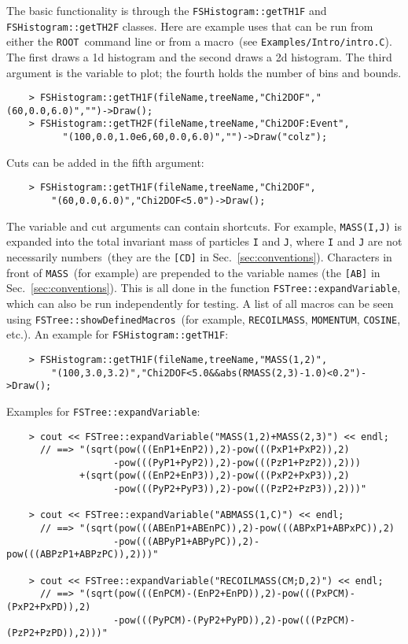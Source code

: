 \documentclass[11pt]{article}
\newcommand{\ROOT}{{\tt ROOT}}
\begin{document}
The basic functionality is through the {\tt FSHistogram::getTH1F} and {\tt FSHistogram::getTH2F} classes.  Here are example uses that can be run from either the \ROOT\ command line or from a macro~(see {\tt Examples/Intro/intro.C}).  The first draws a 1d histogram and the second draws a 2d histogram.  The third argument is the variable to plot; the fourth holds the number of bins and bounds.
\begin{verbatim}
    > FSHistogram::getTH1F(fileName,treeName,"Chi2DOF","(60,0.0,6.0)","")->Draw();
    > FSHistogram::getTH2F(fileName,treeName,"Chi2DOF:Event",
          "(100,0.0,1.0e6,60,0.0,6.0)","")->Draw("colz");
\end{verbatim}
Cuts can be added in the fifth argument:
\begin{verbatim}
    > FSHistogram::getTH1F(fileName,treeName,"Chi2DOF",
        "(60,0.0,6.0)","Chi2DOF<5.0")->Draw();
\end{verbatim}
The variable and cut arguments can contain shortcuts.  For example, {\tt MASS(I,J)} is expanded into the total invariant mass of particles {\tt I} and {\tt J}, where {\tt I} and {\tt J} are not necessarily numbers~(they are the {\tt [CD]} in Sec.~\ref{sec:conventions}).  Characters in front of {\tt MASS}~(for example) are prepended to the variable names (the {\tt [AB]} in Sec.~\ref{sec:conventions}).  This is all done in the function {\tt FSTree::expandVariable}, which can also be run independently for testing.  
A list of all macros can be seen using {\tt FSTree::showDefinedMacros}~(for example, {\tt RECOILMASS}, {\tt MOMENTUM}, {\tt COSINE}, etc.).  An example for {\tt FSHistogram::getTH1F}:
\begin{verbatim}
    > FSHistogram::getTH1F(fileName,treeName,"MASS(1,2)",
        "(100,3.0,3.2)","Chi2DOF<5.0&&abs(RMASS(2,3)-1.0)<0.2")->Draw();
\end{verbatim}
Examples for {\tt FSTree::expandVariable}:
\begin{verbatim}
    > cout << FSTree::expandVariable("MASS(1,2)+MASS(2,3)") << endl;
      // ==> "(sqrt(pow(((EnP1+EnP2)),2)-pow(((PxP1+PxP2)),2)
                   -pow(((PyP1+PyP2)),2)-pow(((PzP1+PzP2)),2)))
             +(sqrt(pow(((EnP2+EnP3)),2)-pow(((PxP2+PxP3)),2)
                   -pow(((PyP2+PyP3)),2)-pow(((PzP2+PzP3)),2)))"

    > cout << FSTree::expandVariable("ABMASS(1,C)") << endl;
      // ==> "(sqrt(pow(((ABEnP1+ABEnPC)),2)-pow(((ABPxP1+ABPxPC)),2)
                   -pow(((ABPyP1+ABPyPC)),2)-pow(((ABPzP1+ABPzPC)),2)))"

    > cout << FSTree::expandVariable("RECOILMASS(CM;D,2)") << endl;
      // ==> "(sqrt(pow(((EnPCM)-(EnP2+EnPD)),2)-pow(((PxPCM)-(PxP2+PxPD)),2)
                   -pow(((PyPCM)-(PyP2+PyPD)),2)-pow(((PzPCM)-(PzP2+PzPD)),2)))"
\end{verbatim}
\end{document}
